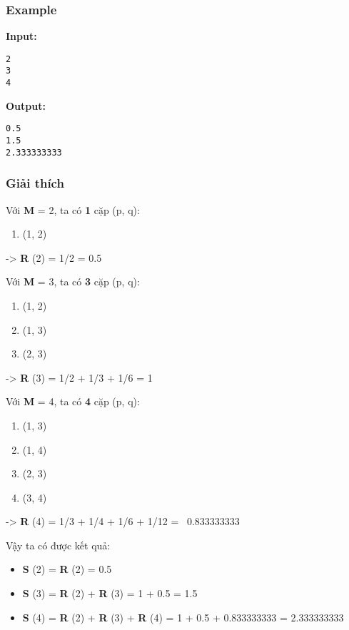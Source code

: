 \subsubsection{   Example  }

\textbf{    Input:   }
\begin{verbatim}
2
3
4
\end{verbatim}

\textbf{    Output:   }
\begin{verbatim}
0.5
1.5
2.333333333\end{verbatim}

\subsubsection{   Giải thích  }

   Với   \textbf{    M   }   = 2, ta có   \textbf{    1   }   cặp (p, q):  
\begin{enumerate}
	\item     (1, 2)   
\end{enumerate}

   ->   \textbf{    R   }   (2) = 1/2 = 0.5  

   Với   \textbf{    M   }   = 3, ta có   \textbf{    3   }   cặp (p, q):  
\begin{enumerate}
	\item     (1, 2)   
	\item     (1, 3)   
	\item     (2, 3)   
\end{enumerate}

   ->   \textbf{    R   }   (3) = 1/2 + 1/3 + 1/6 = 1  

   Với   \textbf{    M   }   = 4, ta có   \textbf{    4   }   cặp (p, q):  
\begin{enumerate}
	\item     (1, 3)   
	\item     (1, 4)   
	\item     (2, 3)   
	\item     (3, 4)   
\end{enumerate}

   ->   \textbf{    R   }   (4) = 1/3 + 1/4 + 1/6 + 1/12 =  0.833333333  

   Vậy ta có được kết quả:  
\begin{itemize}
	\item \textbf{     S    }    (2) =    \textbf{     R    }    (2) = 0.5   
	\item \textbf{     S    }    (3) =    \textbf{     R    }    (2) +    \textbf{     R    }    (3) = 1 + 0.5 = 1.5   
	\item \textbf{     S    }    (4) =    \textbf{     R    }    (2) +    \textbf{     R    }    (3) +    \textbf{     R    }    (4) = 1 + 0.5 + 0.833333333 = 2.333333333   
\end{itemize}
